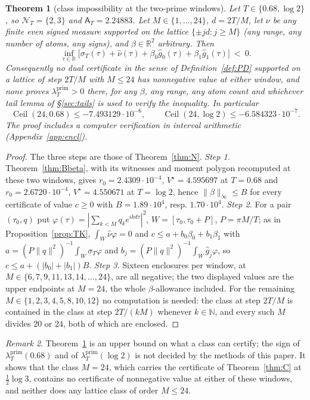 \documentclass[11pt]{amsart}
\newtheorem{theorem}{Theorem}[section]
\theoremstyle{definition}
\theoremstyle{remark}
\newtheorem{remark}[theorem]{Remark}
\newcommand{\R}{\mathbb R}
\newcommand{\N}{\mathbb N}
\newcommand{\lamP}{\lambda^{\mathrm{prim}}_T}
\newcommand{\sT}{\sigma_T}
\newcommand{\gh}[1]{\widehat g_{#1}}
\newcommand{\nuh}{\widehat\nu}
\newcommand{\NT}{\mathcal N_T}
\newcommand{\Aconst}{\mathsf A_T}
\begin{document}
\begin{theorem}[class impossibility at the two-prime windows]\label{thm:Np}
Let $T\in\{0.68,\log2\}$, so $\NT=\{2,3\}$ and
$\Aconst=2.24883$. Let $M\in\{1,\dots,24\}$, $d=2T/M$, let $\nu$ be any finite even signed measure
supported on the lattice $\{\pm jd:j\ge M\}$ (any range, any number of atoms, any signs), and
$\beta\in\R^2$ arbitrary. Then
\[
\inf_{\tau\in\R}\big[\sT(\tau)+\nuh(\tau)+\beta_0\gh0(\tau)+\beta_1\gh1(\tau)\big]\ <\ 0 .
\]
Consequently no dual certificate in the sense of Definition~\ref{def:PD} supported on a lattice of
step $2T/M$ with $M\le24$ has nonnegative value at either window, and none proves $\lamP>0$ there,
for any $\beta$, any range, any atom count and whichever tail lemma of \S\ref{sec:tails} is used to
verify the inequality. In particular
\[
\operatorname{Ceil}(24,0.68)\le-7.493129\cdot10^{-6},\qquad
\operatorname{Ceil}(24,\log2)\le-6.584323\cdot10^{-7}.
\]
The proof includes a computer verification in interval arithmetic (Appendix~\ref{app:encl}).
\end{theorem}
\begin{proof}
The three steps are those of Theorem~\ref{thm:N}. \emph{Step 1.} Theorem~\ref{thm:Bbeta}, with its
witnesses and moment polygon recomputed at these two windows, gives $r_0=2.4309\cdot10^{-4}$,
$V^\star=4.595697$ at $T=0.68$ and $r_0=2.6720\cdot10^{-4}$, $V^\star=4.550671$ at $T=\log2$, hence
$\|\beta\|_\infty\le B$ for every certificate of value $c\ge0$ with $B=1.89\cdot10^4$, resp.
$1.70\cdot10^4$. \emph{Step 2.} For a pair $(\tau_0,q)$ put $\varphi(\tau)=|\sum_{k<M}q_ke^{ikd\tau}|^2$,
$W=[\tau_0,\tau_0+P]$, $P=\pi M/T$; as in Proposition~\ref{prop:TK}, $\int_W\nuh\varphi=0$ and
$c\le a+b_0\beta_0+b_1\beta_1$ with $a=(P\|q\|^2)^{-1}\int_W\sT\varphi$ and
$b_j=(P\|q\|^2)^{-1}\int_W\gh j\varphi$, so $c\le a+(|b_0|+|b_1|)B$. \emph{Step 3.} Sixteen enclosures
per window, at $M\in\{6,7,9,11,13,14,\dots,24\}$, are all negative; the two displayed values are the
upper endpoints at $M=24$, the whole $\beta$-allowance included. For the remaining
$M\in\{1,2,3,4,5,8,10,12\}$ no computation is needed: the class at step $2T/M$ is contained in the
class at step $2T/(kM)$ whenever $k\in\N$, and every such $M$ divides $20$ or $24$, both of which are
enclosed.
\end{proof}

\begin{remark}
Theorem~\ref{thm:Np} is an upper bound on what a class can certify; the sign of $\lamP(0.68)$ and of
$\lamP(\log2)$ is not decided by the methods of this paper. It shows that the class $M=24$, which
carries the certificate of Theorem~\ref{thm:C} at $\frac12\log3$, contains no certificate of
nonnegative value at either of these windows, and neither does any lattice class of order $M\le24$.
\end{remark}
\end{document}
